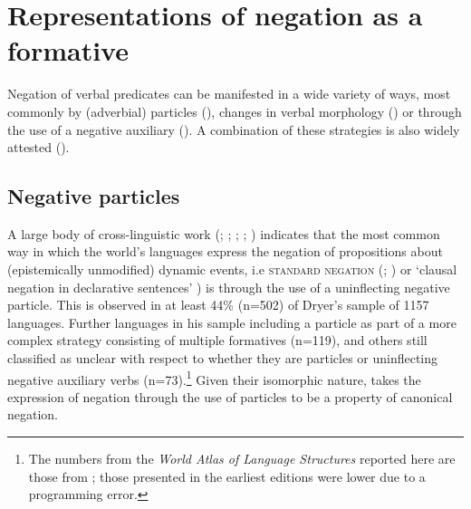 \documentclass[output=paper,hidelinks]{langscibook}
\begin{document}
\section{Representations of negation as a formative}
\label{sec:negation:c-structure}

Negation of verbal predicates can be manifested in a wide variety of ways, most commonly by (adverbial) particles (), changes in verbal morphology () or through the use of a negative auxiliary (). A combination of these strategies is also widely attested ().

\subsection{Negative particles}
\label{sec:negation:particles}

A large body of cross-linguistic work (\citealt {Dahl:79}; \citealt  {Dryer:89}; \citealt  {Payne:85.1}; \citealt  {Miestamo:05}; \citealt  {Dryer13b})  indicates that the most common way in which the world's languages express the negation of propositions about (epistemically unmodified) dynamic events, i.e \textsc{standard negation} (\citealt{Payne:85.1}; \citealt{Miestamo:05}) or `clausal negation in declarative sentences'  \citep {Dryer13b} ) is through the use of a uninflecting negative particle. This is observed in at least 44\% (n=502)  of Dryer's \citeyear {Dryer13b} sample of 1157 languages. Further languages in his sample including a particle as part of a more complex strategy consisting of multiple formatives (n=119), and others still classified as unclear with respect to whether they are particles or uninflecting negative auxiliary verbs (n=73).\footnote{The numbers from the \textit{World Atlas of Language Structures} reported here are those from \citet {Dryer13b}; those presented in the earliest editions were lower due to a programming error.} Given their isomorphic nature, \citet {Bond:13.2} takes the expression of negation through the use of particles to be a property of canonical negation.
\end{document}
